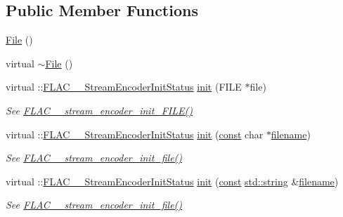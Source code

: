 \subsection*{Public Member Functions}
\begin{DoxyCompactItemize}
\item 
\hyperlink{class_f_l_a_c_1_1_encoder_1_1_file_a6006981e7a5b94ae92c53b6ceae90e51}{File} ()
\item 
virtual \hyperlink{class_f_l_a_c_1_1_encoder_1_1_file_afcd9941610cdcb5ccb3cc5b1a2f14157}{$\sim$\+File} ()
\item 
virtual \+::\hyperlink{group__flac__stream__encoder_ga3bb869620af2b188d77982a5c30b047d}{F\+L\+A\+C\+\_\+\+\_\+\+Stream\+Encoder\+Init\+Status} \hyperlink{class_f_l_a_c_1_1_encoder_1_1_file_abc91903fbc5cabbdc28dc6777b3e7c19}{init} (F\+I\+LE $\ast$file)
\begin{DoxyCompactList}\small\item\em See \hyperlink{group__flac__stream__encoder_ga78653fea5d9bc490fff34e3ef86de944}{F\+L\+A\+C\+\_\+\+\_\+stream\+\_\+encoder\+\_\+init\+\_\+\+F\+I\+L\+E()} \end{DoxyCompactList}\item 
virtual \+::\hyperlink{group__flac__stream__encoder_ga3bb869620af2b188d77982a5c30b047d}{F\+L\+A\+C\+\_\+\+\_\+\+Stream\+Encoder\+Init\+Status} \hyperlink{class_f_l_a_c_1_1_encoder_1_1_file_a7380fed2fa19752c4fee6d1e4522cdb8}{init} (\hyperlink{getopt1_8c_a2c212835823e3c54a8ab6d95c652660e}{const} char $\ast$\hyperlink{test__portburn_8cpp_a7efa5e9c7494c7d4586359300221aa5d}{filename})
\begin{DoxyCompactList}\small\item\em See \hyperlink{group__flac__stream__encoder_ga693bb5ed30d912822e0e6c7c0404428c}{F\+L\+A\+C\+\_\+\+\_\+stream\+\_\+encoder\+\_\+init\+\_\+file()} \end{DoxyCompactList}\item 
virtual \+::\hyperlink{group__flac__stream__encoder_ga3bb869620af2b188d77982a5c30b047d}{F\+L\+A\+C\+\_\+\+\_\+\+Stream\+Encoder\+Init\+Status} \hyperlink{class_f_l_a_c_1_1_encoder_1_1_file_a00efbde7cb05d219cdbb7a325b0577a3}{init} (\hyperlink{getopt1_8c_a2c212835823e3c54a8ab6d95c652660e}{const} \hyperlink{test__lib_f_l_a_c_2format_8c_ab02026ad0de9fb6c1b4233deb0a00c75}{std\+::string} \&\hyperlink{test__portburn_8cpp_a7efa5e9c7494c7d4586359300221aa5d}{filename})
\begin{DoxyCompactList}\small\item\em See \hyperlink{group__flac__stream__encoder_ga693bb5ed30d912822e0e6c7c0404428c}{F\+L\+A\+C\+\_\+\+\_\+stream\+\_\+encoder\+\_\+init\+\_\+file()} \end{DoxyCompactList}\item 

\end{DoxyCompactItemize}
